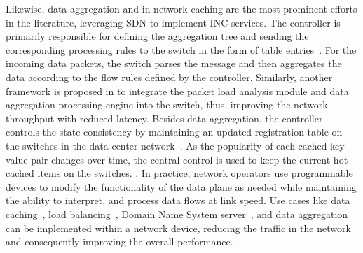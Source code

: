 Likewise, data aggregation and in-network caching are the most prominent efforts in the literature, leveraging SDN to implement INC services. The controller is primarily responsible for defining the aggregation tree and sending the corresponding processing rules to the switch in the form of table entries~\cite{10.1145/3152434.3152461}. For the incoming data packets, the switch parses the message and then aggregates the data according to the flow rules defined by the controller. Similarly, another framework is proposed in \cite{yang2019switchagg} to integrate the packet load analysis module and data aggregation processing engine into the switch, thus, improving the network throughput with reduced latency. Besides data aggregation, the controller controls the state consistency by maintaining an updated registration table on the switches in the data center network~\cite{liu2017incbricks}. As the popularity of each cached key-value pair changes over time, the central control is used to keep the current hot cached items on the switches. \cite{jin2017netcache}. In practice, network operators use programmable devices to modify the functionality of the data plane as needed while maintaining the ability to interpret, and process data flows at link speed. 
%
Use cases like data caching~\cite{jin2017netcache}, load balancing~\cite{grigoryan2019iload}, Domain Name System  server~\cite{woodruff2019p4dns}, and data aggregation~\cite{sapio2019scaling, yang2019switchagg} can be implemented within a network device, reducing the traffic in the network and consequently improving the overall performance.


